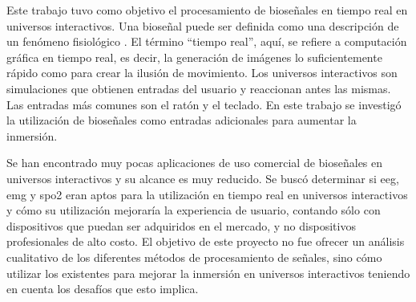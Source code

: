 Este trabajo tuvo como objetivo el procesamiento de bioseñales en tiempo real en universos interactivos. Una bioseñal puede ser definida como una descripción de un fenómeno fisiológico \cite{biosignal-book-2}.  El término ``tiempo real'', aquí, se refiere a computación gráfica en tiempo real, es decir, la generación de imágenes lo suficientemente rápido como para crear la ilusión de movimiento. Los universos interactivos son simulaciones que obtienen entradas del usuario y reaccionan antes las mismas. Las entradas más comunes son el ratón y el teclado. En este trabajo se investigó la utilización de bioseñales como entradas adicionales para aumentar la inmersión.

Se han encontrado muy pocas aplicaciones de uso comercial de bioseñales en universos interactivos y su alcance es muy reducido. Se buscó determinar si \acrshort{eeg}, \acrshort{emg} y \acrshort{spo2} eran aptos para la utilización en tiempo real en universos interactivos y cómo su utilización mejoraría la experiencia de usuario, contando sólo con dispositivos que puedan ser adquiridos en el mercado, y no dispositivos profesionales de alto costo. El objetivo de este proyecto no fue ofrecer un análisis cualitativo de los diferentes métodos de procesamiento de señales, sino cómo utilizar los existentes para mejorar la inmersión en universos interactivos teniendo en cuenta los desafíos que esto implica.